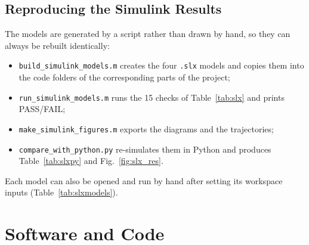 \documentclass[12pt,a4paper]{article}
\begin{document}
\subsection{Reproducing the Simulink Results}
The models are generated by a script rather than drawn by hand, so they can always be rebuilt identically:
\begin{itemize}
\item \texttt{build\_simulink\_models.m} creates the four \texttt{.slx} models and copies them into the code folders of the corresponding parts of the project;
\item \texttt{run\_simulink\_models.m} runs the 15 checks of Table~\ref{tab:slx} and prints PASS/FAIL;
\item \texttt{make\_simulink\_figures.m} exports the diagrams and the trajectories;
\item \texttt{compare\_with\_python.py} re-simulates them in Python and produces Table~\ref{tab:slxpy} and Fig.~\ref{fig:slx_res}.
\end{itemize}
Each model can also be opened and run by hand after setting its workspace inputs (Table~\ref{tab:slxmodels}).

\section{Software and Code}\label{sec:code}
\end{document}
